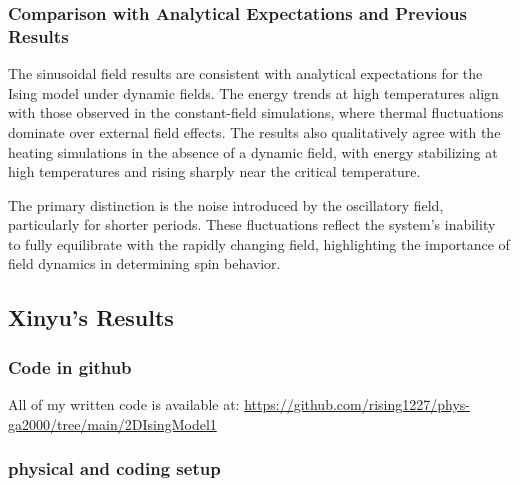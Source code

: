 \documentclass[11pt]{article}
\begin{document}
\subsubsection*{Comparison with Analytical Expectations and Previous Results}
The sinusoidal field results are consistent with analytical expectations for the Ising model under dynamic fields. The energy trends at high temperatures align with those observed in the constant-field simulations, where thermal fluctuations dominate over external field effects. The results also qualitatively agree with the heating simulations in the absence of a dynamic field, with energy stabilizing at high temperatures and rising sharply near the critical temperature.

The primary distinction is the noise introduced by the oscillatory field, particularly for shorter periods. These fluctuations reflect the system's inability to fully equilibrate with the rapidly changing field, highlighting the importance of field dynamics in determining spin behavior.






\subsection{Xinyu's Results}

\subsubsection{Code in github}

All of my written code is available at: \url{https://github.com/rising1227/phys-ga2000/tree/main/2DIsingModel1}

\subsubsection{physical and coding setup}
\end{document}
